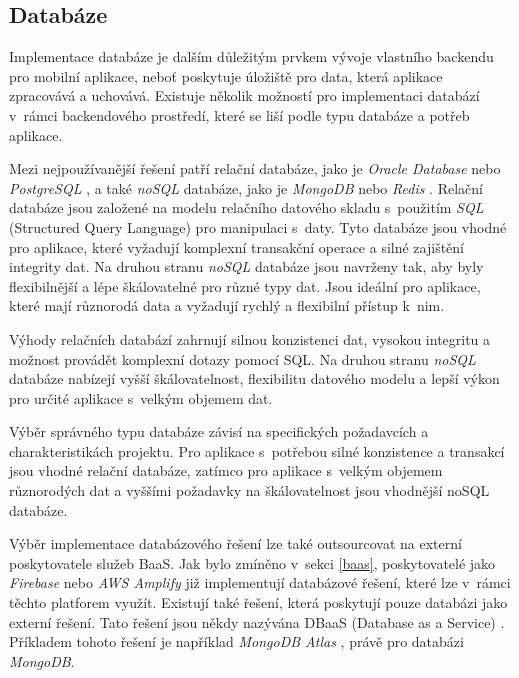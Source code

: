 \subsection{Databáze}

Implementace databáze je dalším důležitým prvkem vývoje vlastního backendu pro mobilní aplikace, neboť poskytuje úložiště pro data, která aplikace zpracovává a uchovává. Existuje několik možností pro implementaci databází v~rámci backendového prostředí, které se liší podle typu databáze a potřeb aplikace.

Mezi nejpoužívanější řešení patří relační databáze, jako je \emph{Oracle Database} \cite{oracle-database} nebo \emph{PostgreSQL} \cite{postgresql}, a také \emph{noSQL} databáze, jako je \emph{MongoDB} \cite{mongodb} nebo \emph{Redis} \cite{redis}. Relační databáze jsou založené na modelu relačního datového skladu s~použitím \emph{SQL} (Structured Query Language) pro manipulaci s~daty. Tyto databáze jsou vhodné pro aplikace, které vyžadují komplexní transakční operace a silné zajištění integrity dat. Na druhou stranu \emph{noSQL} databáze jsou navrženy tak, aby byly flexibilnější a lépe škálovatelné pro různé typy dat. Jsou ideální pro aplikace, které mají různorodá data a vyžadují rychlý a flexibilní přístup k~nim.

Výhody relačních databází zahrnují silnou konzistenci dat, vysokou integritu a možnost provádět komplexní dotazy pomocí SQL. Na druhou stranu \emph{noSQL} databáze nabízejí vyšší škálovatelnost, flexibilitu datového modelu a lepší výkon pro určité aplikace s~velkým objemem dat. \cite{fit-lecture-no-sql}

Výběr správného typu databáze závisí na specifických požadavcích a charakteristikách projektu. Pro aplikace s~potřebou silné konzistence a transakcí jsou vhodné relační databáze, zatímco pro aplikace s~velkým objemem různorodých dat a vyššími požadavky na škálovatelnost jsou vhodnější noSQL databáze.

Výběr implementace databázového řešení lze také outsourcovat na externí poskytovatele služeb BaaS. Jak bylo zmíněno v~sekci \ref{baas}, poskytovatelé jako \emph{Firebase} \cite{firebase} nebo \emph{AWS Amplify} \cite{aws-amplify} již implementují databázové řešení, které lze v~rámci těchto platforem využít. Existují také řešení, která poskytují pouze databázi jako externí řešení. Tato řešení jsou někdy nazývána DBaaS (Database as a Service) \cite{mongodb-dbaas}. Příkladem tohoto řešení je například \emph{MongoDB Atlas} \cite{mongodb-atlas}, právě pro databázi \emph{MongoDB}.

